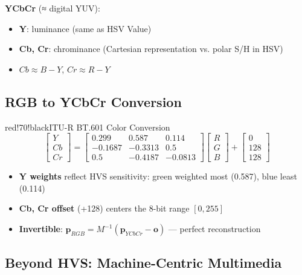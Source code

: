 \textbf{YCbCr} (≈ digital YUV):
\begin{itemize}
\item \textbf{Y}: luminance (same as HSV Value)
\item \textbf{Cb, Cr}: chrominance (Cartesian representation vs. polar S/H in HSV)
\item $Cb \approx B - Y$, $Cr \approx R - Y$
\end{itemize}

\subsection{RGB to YCbCr Conversion}

\begin{calloutbox}{red!70!black}{ITU-R BT.601 Color Conversion}
\[
\begin{bmatrix} Y \\ Cb \\ Cr \end{bmatrix} = \begin{bmatrix} 0.299 & 0.587 & 0.114 \\ -0.1687 & -0.3313 & 0.5 \\ 0.5 & -0.4187 & -0.0813 \end{bmatrix} \begin{bmatrix} R \\ G \\ B \end{bmatrix} + \begin{bmatrix} 0 \\ 128 \\ 128 \end{bmatrix}
\]

\begin{itemize}
\item \textbf{Y weights} reflect HVS sensitivity: green weighted most (0.587), blue least (0.114)
\item \textbf{Cb, Cr offset} (+128) centers the 8-bit range $[0,255]$
\item \textbf{Invertible}: $\mathbf{p}_{RGB} = M^{-1}(\mathbf{p}_{YCbCr} - \mathbf{o})$ — perfect reconstruction
\end{itemize}
\end{calloutbox}

\subsection{Beyond HVS: Machine-Centric Multimedia}

